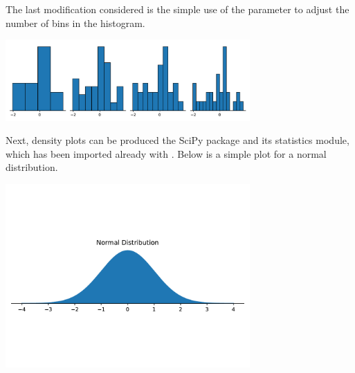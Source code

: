 The last modification considered is the simple use of the  parameter to adjust the number of bins in the histogram. 


\begin{center}
    \includegraphics[width = 0.7\textwidth]{figures/specialplots/bins-hist.pdf}
\end{center}

Next, density plots can be produced the SciPy package and its statistics module, which has been imported already with . Below is a simple plot for a normal distribution. 


\begin{center}
    \includegraphics[width = 0.7\textwidth]{figures/specialplots/normal-pdf.pdf}
\end{center}
